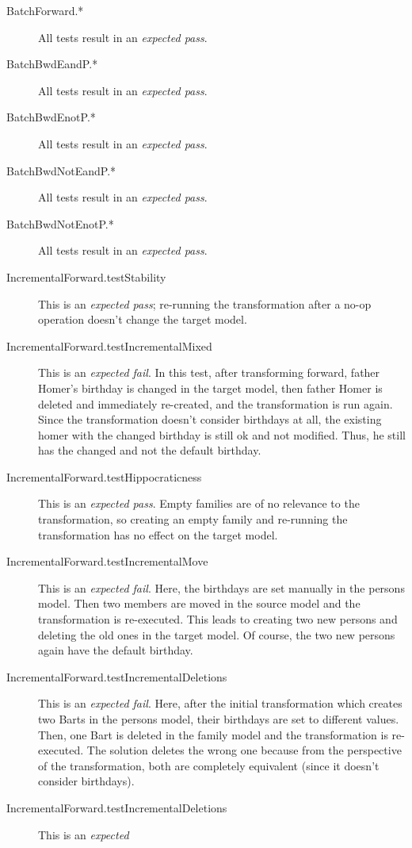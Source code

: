 \documentclass[a4paper]{article}
\begin{document}
\begin{description}
\item[BatchForward.*] All tests result in an \emph{expected pass}.
\item[BatchBwdEandP.*] All tests result in an \emph{expected pass}.
\item[BatchBwdEnotP.*] All tests result in an \emph{expected pass}.
\item[BatchBwdNotEandP.*] All tests result in an \emph{expected pass}.
\item[BatchBwdNotEnotP.*] All tests result in an \emph{expected pass}.
\item[IncrementalForward.testStability] This is an \emph{expected pass};
  re-running the transformation after a no-op operation doesn't change the
  target model.
\item[IncrementalForward.testIncrementalMixed] This is an \emph{expected fail}.
  In this test, after transforming forward, father Homer's birthday is changed
  in the target model, then father Homer is deleted and immediately re-created,
  and the transformation is run again.  Since the transformation doesn't
  consider birthdays at all, the existing homer with the changed birthday is
  still ok and not modified.  Thus, he still has the changed and not the
  default birthday.
\item[IncrementalForward.testHippocraticness] This is an \emph{expected pass}.
  Empty families are of no relevance to the transformation, so creating an
  empty family and re-running the transformation has no effect on the target
  model.
\item[IncrementalForward.testIncrementalMove] This is an \emph{expected fail}.
  Here, the birthdays are set manually in the persons model.  Then two members
  are moved in the source model and the transformation is re-executed.  This
  leads to creating two new persons and deleting the old ones in the target
  model.  Of course, the two new persons again have the default birthday.
\item[IncrementalForward.testIncrementalDeletions] This is an \emph{expected
    fail}.  Here, after the initial transformation which creates two Barts in
  the persons model, their birthdays are set to different values.  Then, one
  Bart is deleted in the family model and the transformation is re-executed.
  The solution deletes the wrong one because from the perspective of the
  transformation, both are completely equivalent (since it doesn't consider
  birthdays).
\item[IncrementalForward.testIncrementalDeletions] This is an \emph{expected
}
\end{description}
\end{document}
